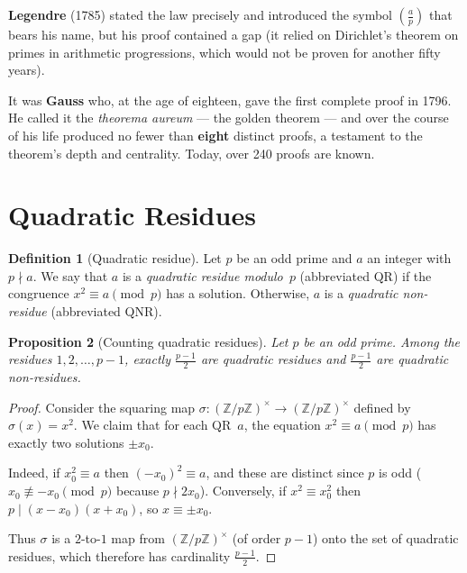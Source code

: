 \documentclass[12pt,a4paper,openany]{book}
\theoremstyle{definition}
\newtheorem{definition}{Definition}[chapter]
\theoremstyle{plain}
\newtheorem{proposition}[definition]{Proposition}
\theoremstyle{remark}
\newcommand{\Z}{\mathbb{Z}}
\newcommand{\legendre}[2]{\left(\frac{#1}{#2}\right)}
\begin{document}
\textbf{Legendre} (1785) stated the law precisely and
introduced the symbol $\legendre{a}{p}$ that bears his name, but his proof contained
a gap (it relied on Dirichlet's theorem on primes in arithmetic progressions, which
would not be proven for another fifty years).

It was \textbf{Gauss} who, at the age of eighteen, gave
the first complete proof in 1796.
He called it the \emph{theorema aureum} --- the golden theorem ---
and over the course of his life produced no fewer than \textbf{eight} distinct proofs,
a testament to the theorem's depth and centrality.
Today, over 240 proofs are known.

\section{Quadratic Residues}
\label{sec:qr-definition}

\begin{definition}[Quadratic residue]
\label{def:qr}
Let $p$ be an odd prime and $a$ an integer with $p \nmid a$.
We say that $a$ is a \emph{quadratic residue modulo~$p$} (abbreviated QR) if the
congruence $x^2 \equiv a \pmod{p}$ has a solution. Otherwise, $a$ is a
\emph{quadratic non-residue} (abbreviated QNR).
\end{definition}

\begin{proposition}[Counting quadratic residues]
\label{prop:count-qr}
Let $p$ be an odd prime. Among the residues $1, 2, \ldots, p-1$, exactly
$\frac{p-1}{2}$ are quadratic residues and $\frac{p-1}{2}$ are quadratic non-residues.
\end{proposition}

\begin{proof}
Consider the squaring map $\sigma \colon (\Z/p\Z)^\times \to (\Z/p\Z)^\times$
defined by $\sigma(x) = x^2$. We claim that for each QR~$a$, the equation
$x^2 \equiv a \pmod{p}$ has exactly two solutions $\pm x_0$.

Indeed, if $x_0^2 \equiv a$ then $(-x_0)^2 \equiv a$, and these are distinct since
$p$ is odd ($x_0 \not\equiv -x_0 \pmod{p}$ because $p \nmid 2x_0$).
Conversely, if $x^2 \equiv x_0^2$ then $p \mid (x - x_0)(x + x_0)$, so $x \equiv \pm x_0$.

Thus $\sigma$ is a $2$-to-$1$ map from $(\Z/p\Z)^\times$ (of order $p-1$) onto
the set of quadratic residues, which therefore has cardinality $\frac{p-1}{2}$.
\end{proof}
\end{document}
